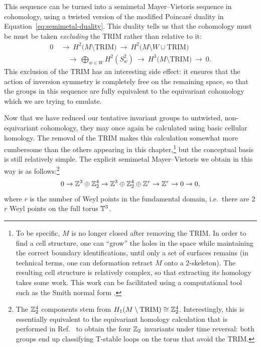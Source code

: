 This sequence can be turned into a semimetal Mayer--Vietoris sequence in cohomology, using a twisted version of the modified Poincaré duality in Equation~\eqref{eq:semimetal-duality}. This duality tells us that the cohomology must be must be taken \emph{excluding} the TRIM rather than relative to it:
\begin{align*}
	0\ &\to\ H^2\big(M\setminus\text{TRIM}\big)\ \to\ H^2\big(M\setminus W\cup\text{TRIM}\big)\ \\
	&\quad\to\ \bigoplus_{w\in W} H^2(S_w^2)\ \to\ H^3\big(M\setminus\text{TRIM}\big)\ \to\ 0.
\end{align*}
This exclusion of the TRIM has an interesting side effect: it ensures that the action of inversion symmetry is completely free on the remaining space, so that the groups in this sequence are fully equivalent to the equivariant cohomology which we are trying to emulate.

Now that we have reduced our tentative invariant groups to untwisted, non-equivariant cohomology, they may once again be calculated using basic cellular homology. The removal of the TRIM makes this calculation somewhat more cumbersome than the others appearing in this chapter,\footnote{
	To be specific, $M$ is no longer closed after removing the TRIM. In order to find a cell structure, one can ``grow'' the holes in the space while maintaining the correct boundary identifications, until only a set of surfaces remains (in technical terms, one can deformation retract $M$ onto a 2-skeleton). The resulting cell structure is relatively complex, so that extracting its homology takes some work. This work can be facilitated using a computational tool such as the Smith normal form \cite{Peltier_Homology-computation}.} %
but the conceptual basis is still relatively simple. The explicit semimetal Mayer--Vietoris we obtain in this way is as follows:\footnote{
	The $\mathbb{Z}_2^4$ components stem from $H_1(M\setminus\text{TRIM})\cong\mathbb{Z}_2^4$. Interestingly, this is essentially equivalent to the equivariant homology calculation that is performed in Ref.~\cite{Thiang_equivariant} to obtain the four $\mathbb{Z}_2$ invariants under time reversal: both groups end up classifying T-stable loops on the torus that avoid the TRIM.}
\begin{equation}\label{eq:inversion-MV-explicit}
	0 \to \mathbb{Z}^3\oplus\mathbb{Z}_2^4 \to \mathbb{Z}^3\oplus\mathbb{Z}_2^4\oplus\mathbb{Z}^r \to \mathbb{Z}^r \to 0 \to 0,
\end{equation}
where $r$ is the number of Weyl points in the fundamental domain, i.e.\ there are 2$r$ Weyl points on the full torus $\mathbb{T}^3$.

